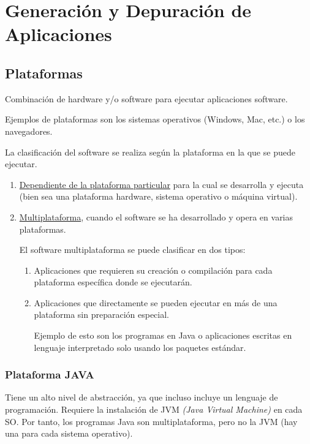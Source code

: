 \chapter{Generación y Depuración de Aplicaciones}
\section{Plataformas}

\begin{definicion}
    Combinación de hardware y/o software para ejecutar aplicaciones software.
    
    Ejemplos de plataformas son los sistemas operativos (Windows, Mac, etc.) o los navegadores.
\end{definicion}

La clasificación del software se realiza según la plataforma en la que se puede ejecutar.
\begin{enumerate}
    \item \underline{Dependiente de la plataforma particular} para la cual se desarrolla y ejecuta (bien sea una plataforma hardware, sistema operativo o máquina virtual).

    \item \underline{Multiplataforma}, cuando el software se ha desarrollado y opera en varias plataformas.

    El software multiplataforma se puede clasificar en dos tipos:
    \begin{enumerate}
        \item Aplicaciones que requieren su creación o compilación para cada plataforma específica donde se ejecutarán.

        \item Aplicaciones que directamente se pueden ejecutar en más de una plataforma sin preparación especial.
        
        Ejemplo de esto son los programas en Java o aplicaciones escritas en lenguaje interpretado solo usando los paquetes estándar.
    \end{enumerate}
\end{enumerate}


\subsection{Plataforma JAVA}

Tiene un alto nivel de abstracción, ya que incluso incluye un lenguaje de programación. Requiere la instalación de JVM \textit{(Java Virtual Machine)} en cada SO. Por tanto, los programas Java son multiplataforma, pero no la JVM (hay una para cada sistema operativo).

